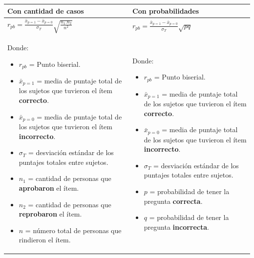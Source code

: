 \documentclass[
  letterpaper,
  DIV=11,
  numbers=noendperiod]{scrreprt}
\begin{document}
\begin{longtable}[]{@{}
  >{\raggedright\arraybackslash}p{}
  >{\raggedright\arraybackslash}p{}@{}}
\toprule\noalign{}
\begin{minipage}[b]{\linewidth}\raggedright
Con cantidad de casos
\end{minipage} & \begin{minipage}[b]{\linewidth}\raggedright
Con probabilidades
\end{minipage} \\
\midrule\noalign{}
\endhead
\bottomrule\noalign{}
\endlastfoot
\(
r_{pb} = \frac{\bar{x}_{p = 1} - \bar{x}_{p = 0}}{\sigma_T} \sqrt{\frac{n_1 . n_2}{n^2}}
\) & \(
r_{pb} = \frac{\bar{x}_{p = 1} - \bar{x}_{p = 0}}{\sigma_T} \sqrt{pq}
\) \\
\begin{minipage}[t]{\linewidth}\raggedright
Donde:

\begin{itemize}
\item
  \(r_{pb}\) = Punto biserial.
\item
  \(\bar{x}_{p = 1}\) = media de puntaje total de los sujetos que
  tuvieron el ítem \textbf{correcto}.
\item
  \(\bar{x}_{p = 0}\) = media de puntaje total de los sujetos que
  tuvieron el ítem \textbf{incorrecto}.
\item
  \(\sigma_T\) = desviación estándar de los puntajes totales entre
  sujetos.
\item
  \(n_1\) = cantidad de personas que \textbf{aprobaron} el ítem.
\item
  \(n_2\) = cantidad de personas que \textbf{reprobaron} el ítem.
\item
  \(n\) = número total de personas que rindieron el ítem.
\end{itemize}
\end{minipage} & \begin{minipage}[t]{\linewidth}\raggedright
Donde:

\begin{itemize}
\item
  \(r_{pb}\) = Punto biserial.
\item
  \(\bar{x}_{p = 1}\) = media de puntaje total de los sujetos que
  tuvieron el ítem \textbf{correcto}.
\item
  \(\bar{x}_{p = 0}\) = media de puntaje total de los sujetos que
  tuvieron el ítem \textbf{incorrecto}.
\item
  \(\sigma_T\) = desviación estándar de los puntajes totales entre
  sujetos.
\item
  \(p\) = probabilidad de tener la pregunta \textbf{correcta}.
\item
  \(q\) = probabilidad de tener la pregunta \textbf{incorrecta}.
\end{itemize}
\end{minipage} \\
\end{longtable}
\end{document}
